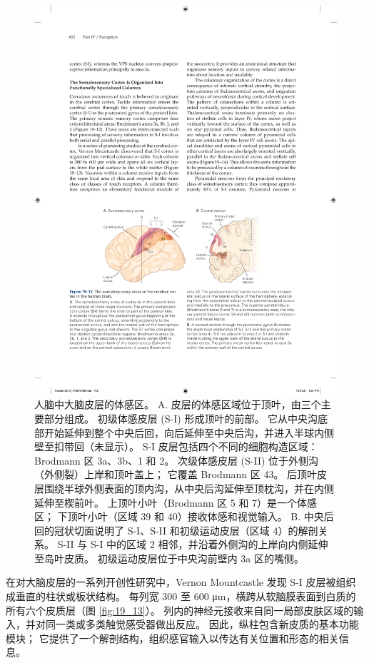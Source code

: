 \begin{figure}[htbp]
	\centering
	\includegraphics[width=1.0\linewidth]{chap19/fig_19_12}
	\caption{人脑中大脑皮层的体感区。 
		A. 皮层的体感区域位于顶叶，由三个主要部分组成。 
		初级体感皮层 (S-I) 形成顶叶的前部。 
		它从中央沟底部开始延伸到整个中央后回，向后延伸至中央后沟，并进入半球内侧壁至扣带回（未显示）。 
		S-I 皮层包括四个不同的细胞构造区域：Brodmann 区 3a、3b、1 和 2。
		次级体感皮层 (S-II) 位于外侧沟（外侧裂）上岸和顶叶盖上； 
		它覆盖 Brodmann 区 43。
		后顶叶皮层围绕半球外侧表面的顶内沟，从中央后沟延伸至顶枕沟，并在内侧延伸至楔前叶。 
		上顶叶小叶（Brodmann 区 5 和 7）是一个体感区； 
		下顶叶小叶（区域 39 和 40）接收体感和视觉输入。 
		B. 中央后回的冠状切面说明了 S-I、S-II 和初级运动皮层（区域 4）的解剖关系。 
		S-II 与 S-I 中的区域 2 相邻，并沿着外侧沟的上岸向内侧延伸至岛叶皮质。 
		初级运动皮层位于中央沟前壁内 3a 区的嘴侧。}
	\label{fig:19_12}
\end{figure}

在对大脑皮层的一系列开创性研究中，Vernon Mountcastle 发现 S-I 皮层被组织成垂直的柱状或板状结构。 
每列宽 300 至 600 μm，横跨从软脑膜表面到白质的所有六个皮质层（图 \ref{fig:19_13}）。 
列内的神经元接收来自同一局部皮肤区域的输入，并对同一类或多类触觉感受器做出反应。 
因此，纵柱包含新皮质的基本功能模块； 它提供了一个解剖结构，组织感官输入以传达有关位置和形态的相关信息。


